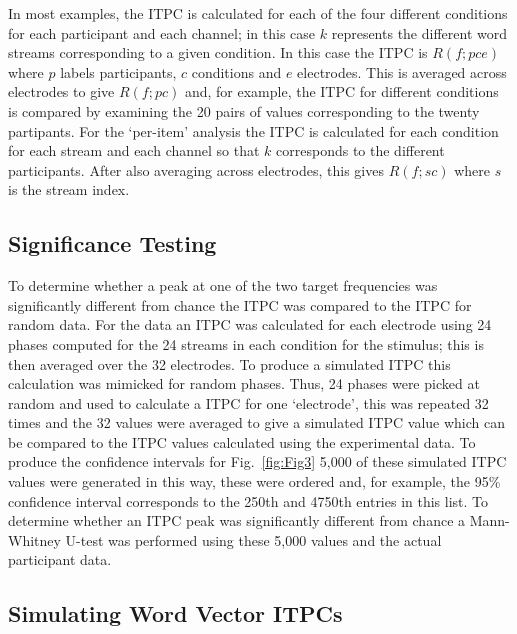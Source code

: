 \documentclass[10pt,letterpaper]{article}
\begin{document}
In most examples, the ITPC is calculated for each of the four
different conditions for each participant and each channel; in this
case $k$ represents the different word streams corresponding to a
given condition. In this case the ITPC is $R(f;pce)$ where $p$ labels
participants, $c$ conditions and $e$ electrodes. This is averaged across
electrodes to give $R(f;pc)$ and, for example, the ITPC for different
conditions is compared by examining the 20 pairs of values
corresponding to the twenty partipants. For the `per-item' analysis
the ITPC is calculated for each condition for each stream and each
channel so that $k$ corresponds to the different participants. After
also averaging across electrodes, this gives $R(f;sc)$ where $s$ is
the stream index.

\subsection*{Significance Testing}

To determine whether a peak at one of the two target frequencies was
significantly different from chance the ITPC was compared to the ITPC
for random data. For the data an ITPC was calculated for each
electrode using 24 phases computed for the 24 streams in each
condition for the stimulus; this is then averaged over the 32
electrodes. To produce a simulated ITPC this calculation was mimicked
for random phases. Thus, 24 phases were picked at random and used to
calculate a ITPC for one `electrode', this was repeated 32 times and
the 32 values were averaged to give a simulated ITPC value which can
be compared to the ITPC values calculated using the experimental
data. To produce the confidence intervals for Fig.~\ref{fig:Fig3}
5,000 of these simulated ITPC values were generated in this way, these
were ordered and, for example, the 95\% confidence interval
corresponds to the 250th and 4750th entries in this list. To determine
whether an ITPC peak was significantly different from chance a
Mann-Whitney U-test was performed using these 5,000 values and the
actual participant data.

\subsection*{Simulating Word Vector ITPCs}
\end{document}
